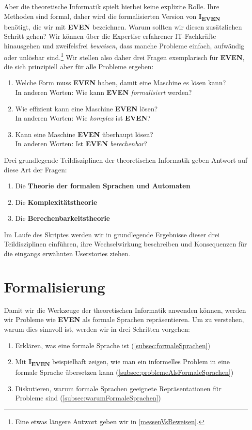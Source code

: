 Aber die theoretische Informatik spielt hierbei keine explizite Rolle.
Ihre Methoden sind formal,
daher wird die formalisierten Version von \textbf{I\textsubscript{EVEN}} benötigt,
die wir mit \textbf{EVEN} bezeichnen.
Warum sollten wir diesen zusätzlichen Schritt gehen?
Wir können über die Expertise erfahrener IT-Fachkräfte hinausgehen
und zweifelsfrei \emph{beweisen},
dass manche Probleme einfach, aufwändig oder unlösbar sind.\footnote{
    Eine etwas längere Antwort geben wir in \autoref{messenVsBeweisen}.
}
Wir stellen also daher drei Fragen exemplarisch für \textbf{EVEN},
die sich prinzipiell aber für alle Probleme ergeben:
\begin{enumerate}
    \item Welche Form muss \textbf{EVEN} haben, damit eine Maschine es lösen kann?\\ 
        In anderen Worten: Wie kann \textbf{EVEN} \emph{formalisiert} werden? 
    \item Wie effizient kann eine Maschine \textbf{EVEN} lösen?\\
        In anderen Worten: Wie \emph{komplex} ist \textbf{EVEN}?
    \item Kann eine Maschine \textbf{EVEN} überhaupt lösen?\\
        In anderen Worten: Ist \textbf{EVEN} \emph{berechenbar}?  
\end{enumerate}
Drei grundlegende Teildisziplinen der theoretischen Informatik
geben Antwort auf diese Art der Fragen:
\begin{enumerate}
    \item Die \textbf{Theorie der formalen Sprachen und Automaten}
    \item Die \textbf{Komplexitätstheorie}
    \item Die \textbf{Berechenbarkeitstheorie}
\end{enumerate}
Im Laufe des Skriptes werden wir
in grundlegende Ergebnisse dieser drei Teildisziplinen einführen,
ihre Wechselwirkung beschreiben
und Konsequenzen für die eingangs erwähnten Userstories ziehen.

\section{Formalisierung}\label{sec:formalisierung}

Damit wir die Werkzeuge der theoretischen Informatik anwenden können,
werden wir Probleme wie \textbf{EVEN} als formale Sprachen repräsentieren.
Um zu verstehen, warum dies sinnvoll ist,
werden wir in drei Schritten vorgehen:
\begin{enumerate}
    \item Erklären, was eine formale Sprache ist (\autoref{subsec:formaleSprachen})
    \item Mit \textbf{I\textsubscript{EVEN}} beispielhaft zeigen,
        wie man ein informelles Problem in eine formale Sprache übersetzen kann 
        (\autoref{subsec:problemeAlsFormaleSprachen})
    \item Diskutieren, warum formale Sprachen geeignete Repräsentationen für Probleme sind
        (\autoref{subsec:warumFormaleSprachen})
\end{enumerate}

